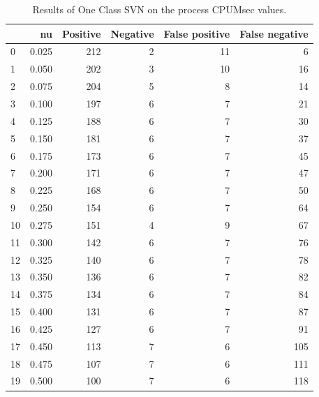 \documentclass[a4paper,twoside,12pt]{book}
\begin{document}
\begin{appendices}
\begin{table}
	\centering
	\caption{Results of One Class SVN on the process CPUMsec values.}
	\label{id:tab:OCSVMCPUMsec}
	\begin{tabular}{lrrrrr}
		\toprule
		{} &     nu &  Positive &  Negative &  False positive &  False negative \\
		\midrule
		0  &  0.025 &       212 &         2 &              11 &               6 \\
		1  &  0.050 &       202 &         3 &              10 &              16 \\
		2  &  0.075 &       204 &         5 &               8 &              14 \\
		3  &  0.100 &       197 &         6 &               7 &              21 \\
		4  &  0.125 &       188 &         6 &               7 &              30 \\
		5  &  0.150 &       181 &         6 &               7 &              37 \\
		6  &  0.175 &       173 &         6 &               7 &              45 \\
		7  &  0.200 &       171 &         6 &               7 &              47 \\
		8  &  0.225 &       168 &         6 &               7 &              50 \\
		9  &  0.250 &       154 &         6 &               7 &              64 \\
		10 &  0.275 &       151 &         4 &               9 &              67 \\
		11 &  0.300 &       142 &         6 &               7 &              76 \\
		12 &  0.325 &       140 &         6 &               7 &              78 \\
		13 &  0.350 &       136 &         6 &               7 &              82 \\
		14 &  0.375 &       134 &         6 &               7 &              84 \\
		15 &  0.400 &       131 &         6 &               7 &              87 \\
		16 &  0.425 &       127 &         6 &               7 &              91 \\
		17 &  0.450 &       113 &         7 &               6 &             105 \\
		18 &  0.475 &       107 &         7 &               6 &             111 \\
		19 &  0.500 &       100 &         7 &               6 &             118 \\

\end{tabular}
\end{table}
\end{appendices}
\end{document}
